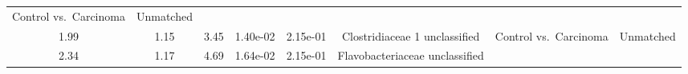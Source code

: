 \documentclass[12pt,]{article}
\begin{document}
\begin{longtable}[]{@{}cccccccc@{}}
\begin{minipage}[t]{0.14\columnwidth}
Control vs.~Carcinoma\strut
\end{minipage} & \begin{minipage}[t]{0.09\columnwidth}\centering\strut
Unmatched\strut
\end{minipage}\tabularnewline
\begin{minipage}[t]{0.05\columnwidth}\centering\strut
1.99\strut
\end{minipage} & \begin{minipage}[t]{0.09\columnwidth}\centering\strut
1.15\strut
\end{minipage} & \begin{minipage}[t]{0.09\columnwidth}\centering\strut
3.45\strut
\end{minipage} & \begin{minipage}[t]{0.07\columnwidth}\centering\strut
1.40e-02\strut
\end{minipage} & \begin{minipage}[t]{0.07\columnwidth}\centering\strut
2.15e-01\strut
\end{minipage} & \begin{minipage}[t]{0.20\columnwidth}\centering\strut
Clostridiaceae 1 unclassified\strut
\end{minipage} & \begin{minipage}[t]{0.14\columnwidth}\centering\strut
Control vs.~Carcinoma\strut
\end{minipage} & \begin{minipage}[t]{0.09\columnwidth}\centering\strut
Unmatched\strut
\end{minipage}\tabularnewline
\begin{minipage}[t]{0.05\columnwidth}\centering\strut
2.34\strut
\end{minipage} & \begin{minipage}[t]{0.09\columnwidth}\centering\strut
1.17\strut
\end{minipage} & \begin{minipage}[t]{0.09\columnwidth}\centering\strut
4.69\strut
\end{minipage} & \begin{minipage}[t]{0.07\columnwidth}\centering\strut
1.64e-02\strut
\end{minipage} & \begin{minipage}[t]{0.07\columnwidth}\centering\strut
2.15e-01\strut
\end{minipage} & \begin{minipage}[t]{0.20\columnwidth}\centering\strut
Flavobacteriaceae unclassified\strut
\end{minipage} & \begin{minipage}[t]{0.14\columnwidth}\centering\strut

\end{minipage}
\end{longtable}
\end{document}
